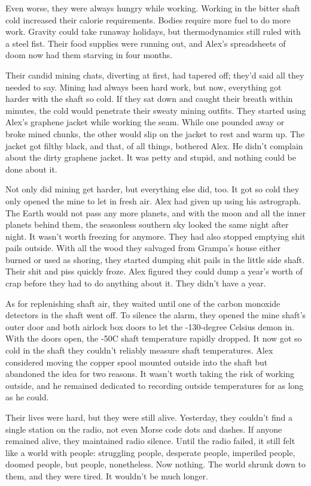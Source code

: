 Even worse, they were always hungry while working. Working in the bitter
shaft cold increased their calorie requirements. Bodies require more
fuel to do more work. Gravity could take runaway holidays, but
thermodynamics still ruled with a steel fist. Their food supplies were
running out, and Alex's spreadsheets of doom now had them starving in
four months.

Their candid mining chats, diverting at first, had tapered off; they'd
said all they needed to say. Mining had always been hard work, but now,
everything got harder with the shaft so cold. If they sat down and
caught their breath within minutes, the cold would penetrate their
sweaty mining outfits. They started using Alex's graphene jacket while
working the seam. While one pounded away or broke mined chunks, the
other would slip on the jacket to rest and warm up. The jacket got
filthy black, and that, of all things, bothered Alex. He didn't complain
about the dirty graphene jacket. It was petty and stupid, and nothing
could be done about it.

Not only did mining get harder, but everything else did, too. It got so
cold they only opened the mine to let in fresh air. Alex had given up
using his astrograph. The Earth would not pass any more planets, and
with the moon and all the inner planets behind them, the seasonless
southern sky looked the same night after night. It wasn't worth freezing
for anymore. They had also stopped emptying shit pails outside. With all
the wood they salvaged from Grampa's house either burned or used as
shoring, they started dumping shit pails in the little side shaft. Their
shit and piss quickly froze. Alex figured they could dump a year's worth
of crap before they had to do anything about it. They didn't have a
year.

As for replenishing shaft air, they waited until one of the carbon
monoxide detectors in the shaft went off. To silence the alarm, they
opened the mine shaft's outer door and both airlock box doors to let the
-130-degree Celsius demon in. With the doors open, the -50C shaft
temperature rapidly dropped. It now got so cold in the shaft they
couldn't reliably measure shaft temperatures. Alex considered moving the
copper spool mounted outside into the shaft but abandoned the idea for
two reasons. It wasn't worth taking the risk of working outside, and he
remained dedicated to recording outside temperatures for as long as he
could.

Their lives were hard, but they were still alive. Yesterday, they
couldn't find a single station on the radio, not even Morse code dots
and dashes. If anyone remained alive, they maintained radio silence.
Until the radio failed, it still felt like a world with people:
struggling people, desperate people, imperiled people, doomed people,
but people, nonetheless. Now nothing. The world shrunk down to them, and
they were tired. It wouldn't be much longer.

